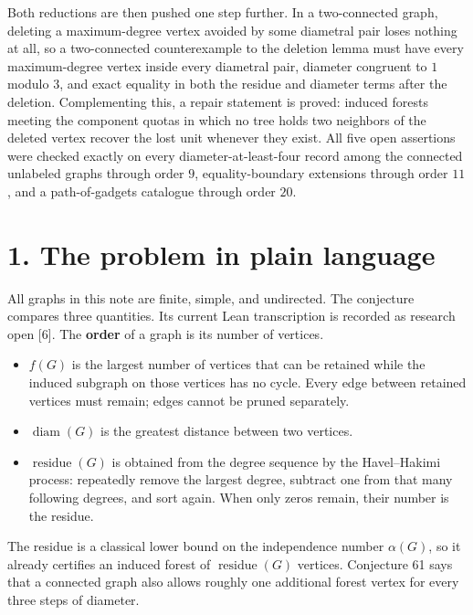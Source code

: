 \documentclass[
  11pt,
  letterpaper,
]{article}
\providecommand{\tightlist}{%
  \setlength{\itemsep}{0pt}\setlength{\parskip}{0pt}}
\begin{document}
Both reductions are then pushed one step further. In a two-connected
graph, deleting a maximum-degree vertex avoided by some diametral pair
loses nothing at all, so a two-connected counterexample to the deletion
lemma must have every maximum-degree vertex inside every diametral pair,
diameter congruent to \(1\) modulo \(3\), and exact equality in both the
residue and diameter terms after the deletion. Complementing this, a
repair statement is proved: induced forests meeting the component quotas
in which no tree holds two neighbors of the deleted vertex recover the
lost unit whenever they exist. All five open assertions were checked
exactly on every diameter-at-least-four record among the connected
unlabeled graphs through order \(9\), equality-boundary extensions
through order \(11\), and a path-of-gadgets catalogue through order
\(20\).

\section{1. The problem in plain
language}\label{the-problem-in-plain-language}

All graphs in this note are finite, simple, and undirected. The
conjecture compares three quantities. Its current Lean transcription is
recorded as research open {[}6{]}. The \textbf{order} of a graph is its
number of vertices.

\begin{itemize}
\tightlist
\item
  \(f(G)\) is the largest number of vertices that can be retained while
  the induced subgraph on those vertices has no cycle. Every edge
  between retained vertices must remain; edges cannot be pruned
  separately.
\item
  \(\operatorname{diam}(G)\) is the greatest distance between two
  vertices.
\item
  \(\operatorname{residue}(G)\) is obtained from the degree sequence by
  the Havel--Hakimi process: repeatedly remove the largest degree,
  subtract one from that many following degrees, and sort again. When
  only zeros remain, their number is the residue.
\end{itemize}

The residue is a classical lower bound on the independence number
\(\alpha(G)\), so it already certifies an induced forest of
\(\operatorname{residue}(G)\) vertices. Conjecture 61 says that a
connected graph also allows roughly one additional forest vertex for
every three steps of diameter.
\end{document}
